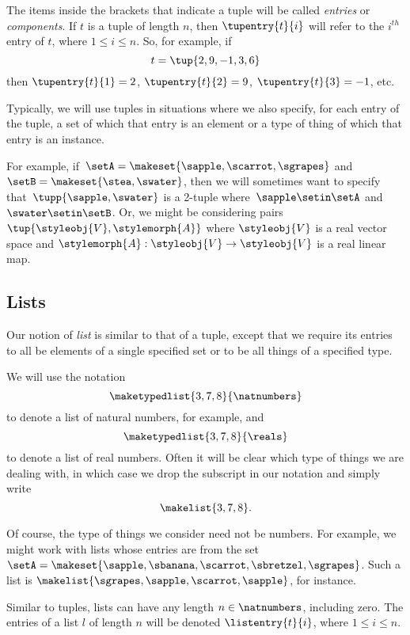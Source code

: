 The items inside the brackets that indicate a tuple will be called \emph{entries} or \emph{components}.
If $t$ is a tuple of length $n$, then $\tupentry{t}{i}$ will refer to the $i^{th}$ entry of $t$, where $1 \leq i \leq n$.
So, for example, if
\begin{equation}
    t = \tup{2,9,-1, 3, 6}
\end{equation}
then $\tupentry{t}{1} = 2$, $\tupentry{t}{2} = 9$, $\tupentry{t}{3} = -1$, etc.

Typically, we will use tuples in situations where we also specify, for each entry of the tuple, a set of which that entry is an element or a type of thing of which that entry is an instance.

For example, if~$\setA = \makeset{ \sapple, \scarrot, \sgrapes}$ and~$\setB = \makeset{ \stea, \swater }$, then we will sometimes want to specify that~$\tupp{\sapple, \swater}$ is a 2-tuple where~$\sapple \setin\setA$ and~$\swater \setin\setB$.
Or, we might be considering pairs $\tup{\styleobj{V}, \stylemorph{A}}$ where $\styleobj{V}$ is a real vector space and $\stylemorph{A}: \styleobj{V} \rightarrow \styleobj{V}$ is a real linear map.

\subsection{Lists}
\label{sec:lists}

Our notion of \emph{list} is similar to that of a tuple, except that we require its entries to all be elements of a single specified set or to be all things of a specified type.

We will use the notation $$\maketypedlist{3, 7, 8}{\natnumbers}$$ to denote a list of natural numbers, for example, and $$\maketypedlist{3, 7, 8}{\reals}$$ to denote a list of real numbers.
Often it will be clear which type of things we are dealing with, in which case we drop the subscript in our notation and simply write $$\makelist{3, 7, 8}.
$$

Of course, the type of things we consider need not be numbers.
For example, we might work with lists whose entries are from the set  $\setA = \makeset{\sapple, \sbanana, \scarrot, \sbretzel, \sgrapes}$.
Such a list is $\makelist{\sgrapes, \sapple, \scarrot, \sapple}$, for instance.

Similar to tuples, lists can have any length $n \in \natnumbers$, including zero.
The entries of a list $l$ of length $n$ will be denoted $\listentry{t}{i}$, where $1 \leq i \leq n$.

